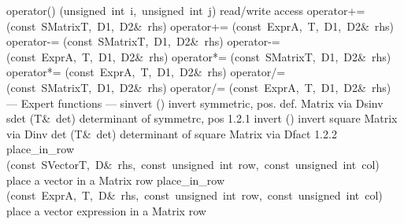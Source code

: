 \documentclass{article}
\begin{document}
\begin{cxxentry}
\begin{cxxclass}
\begin{cxxpublic}
        {}
\label{cxx.1.2.35}
        {operator()}
        {(unsigned\ int\ i,\ unsigned\ int\ j)}
        { read/write access}
        {}
\label{cxx.1.2.36}
        {operator+=}
        {(const\ SMatrix\<T,\ D1,\ D2\>\&\ rhs)}
        {}
        {}
\label{cxx.1.2.37}
        {operator+=}
        {(const\ Expr\<A,\ T,\ D1,\ D2\>\&\ rhs)}
        {}
        {}
\label{cxx.1.2.38}
        {operator-=}
        {(const\ SMatrix\<T,\ D1,\ D2\>\&\ rhs)}
        {}
        {}
\label{cxx.1.2.39}
        {operator-=}
        {(const\ Expr\<A,\ T,\ D1,\ D2\>\&\ rhs)}
        {}
        {}
\label{cxx.1.2.40}
        {operator*=}
        {(const\ SMatrix\<T,\ D1,\ D2\>\&\ rhs)}
        {}
        {}
\label{cxx.1.2.41}
        {operator*=}
        {(const\ Expr\<A,\ T,\ D1,\ D2\>\&\ rhs)}
        {}
        {}
\label{cxx.1.2.42}
        {operator/=}
        {(const\ SMatrix\<T,\ D1,\ D2\>\&\ rhs)}
        {}
        {}
\label{cxx.1.2.43}
        {operator/=}
        {(const\ Expr\<A,\ T,\ D1,\ D2\>\&\ rhs)}
        {}
        {}
\label{cxx.1.2.44}
\cxxitem{}
        {--- Expert functions --- }
        {}
        {}
        {}
\label{cxx.1.2.45}
        {sinvert}
        {()}
        { invert symmetric, pos. def. Matrix via Dsinv}
        {}
\label{cxx.1.2.46}
        {sdet}
        {(T\&\ det)}
        {determinant of symmetrc, pos}
        {1.2.1}
        {invert}
        {()}
        { invert square Matrix via Dinv}
        {}
\label{cxx.1.2.47}
        {det}
        {(T\&\ det)}
        {determinant of square Matrix via Dfact}
        {1.2.2}
        {place\_in\_row}
        {(const\ SVector\<T,\ D\>\&\ rhs,\ const\ unsigned\ int\ row,\ const\ unsigned\ int\ col)}
        { place a vector in a Matrix row}
        {}
\label{cxx.1.2.48}
        {place\_in\_row}
        {(const\ Expr\<A,\ T,\ D\>\&\ rhs,\ const\ unsigned\ int\ row,\ const\ unsigned\ int\ col)}
        { place a vector expression in a Matrix row}
        {}
\label{cxx.1.2.49}

\end{cxxpublic}
\end{cxxclass}
\end{cxxentry}
\end{document}
